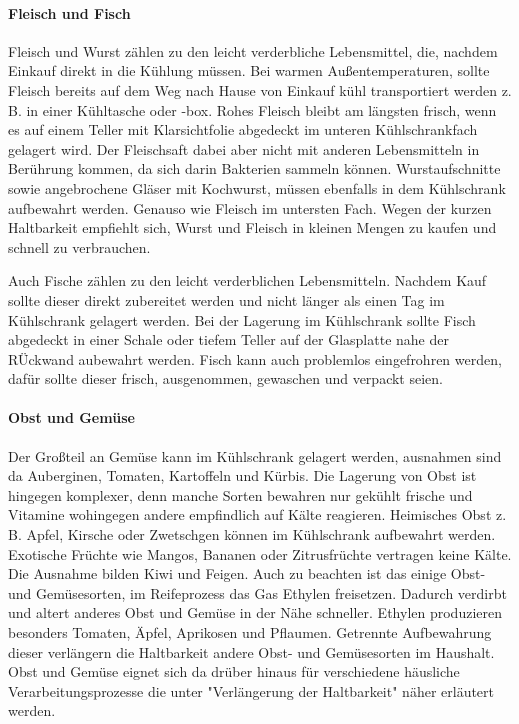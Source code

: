  \paragraph{Fleisch und Fisch}
Fleisch und Wurst zählen zu den leicht verderbliche Lebensmittel, die, nachdem Einkauf direkt in die Kühlung müssen. Bei warmen Außentemperaturen, sollte Fleisch bereits auf dem Weg nach Hause von Einkauf kühl transportiert werden z. B. in einer Kühltasche oder -box.
Rohes Fleisch bleibt am längsten frisch, wenn es auf einem Teller mit Klarsichtfolie abgedeckt im unteren Kühlschrankfach gelagert wird. Der Fleischsaft dabei aber nicht mit anderen Lebensmitteln in Berührung kommen, da sich darin Bakterien sammeln können.
Wurstaufschnitte sowie angebrochene Gläser mit Kochwurst, müssen ebenfalls in dem Kühlschrank aufbewahrt werden. Genauso wie Fleisch im untersten Fach.
Wegen der kurzen Haltbarkeit empfiehlt sich, Wurst und Fleisch in kleinen Mengen zu kaufen und schnell zu verbrauchen. %

Auch Fische zählen zu den leicht verderblichen Lebensmitteln. Nachdem Kauf sollte dieser direkt zubereitet werden und nicht länger als einen Tag im Kühlschrank gelagert werden. Bei der Lagerung im Kühlschrank sollte Fisch abgedeckt in einer Schale oder tiefem  Teller  auf der Glasplatte nahe der RÜckwand aubewahrt werden. Fisch kann auch problemlos eingefrohren werden, dafür sollte dieser frisch, ausgenommen, gewaschen und verpackt seien. 


 \paragraph{Obst und Gemüse}
 
 Der Großteil an Gemüse kann im Kühlschrank gelagert werden, ausnahmen sind da Auberginen, Tomaten, Kartoffeln und Kürbis. Die Lagerung von Obst ist hingegen komplexer, denn manche Sorten bewahren nur gekühlt frische und Vitamine wohingegen andere empfindlich auf Kälte reagieren. Heimisches Obst z. B. Apfel, Kirsche oder Zwetschgen können im Kühlschrank aufbewahrt werden. Exotische Früchte wie Mangos, Bananen oder Zitrusfrüchte vertragen keine Kälte. Die Ausnahme bilden Kiwi und Feigen. Auch zu beachten ist das einige Obst- und Gemüsesorten, im Reifeprozess das Gas Ethylen freisetzen. Dadurch verdirbt und altert anderes Obst und Gemüse in der Nähe schneller. Ethylen produzieren besonders Tomaten, Äpfel, Aprikosen und Pflaumen. Getrennte Aufbewahrung dieser verlängern die Haltbarkeit andere Obst- und Gemüsesorten im Haushalt. Obst und Gemüse eignet sich da drüber hinaus für verschiedene häusliche Verarbeitungsprozesse die unter "Verlängerung der Haltbarkeit" näher erläutert werden.  %


